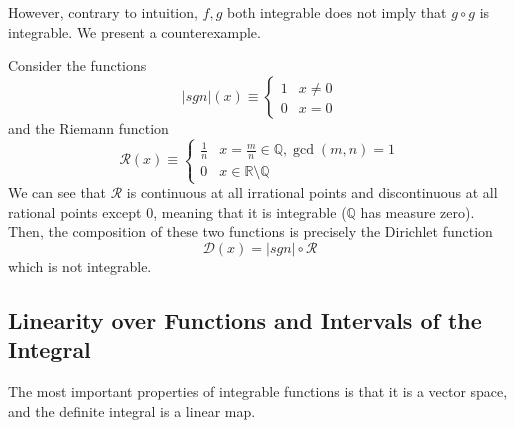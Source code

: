   However, contrary to intuition, $f, g$ both integrable does not imply that $g \circ g$ is integrable. We present a counterexample. 

  \begin{example}
    Consider the functions
    \[|sgn|(x) \equiv \begin{cases}
    1 & x \neq 0 \\
    0 & x = 0
    \end{cases}\]
    and the Riemann function 
    \[\mathcal{R}(x) \equiv \begin{cases}
    \frac{1}{n} & x = \frac{m}{n} \in \mathbb{Q}, \gcd(m, n) = 1 \\
    0 & x \in \mathbb{R} \setminus \mathbb{Q}
    \end{cases}\]
    We can see that $\mathcal{R}$ is continuous at all irrational points and discontinuous at all rational points except $0$, meaning that it is integrable ($\mathbb{Q}$ has measure zero). Then, the composition of these two functions is precisely the Dirichlet function
    \[\mathcal{D}(x) = |sgn| \circ \mathcal{R}\]
    which is not integrable. 
  \end{example}

\subsection{Linearity over Functions and Intervals of the Integral} 

  The most important properties of integrable functions is that it is a vector space, and the definite integral is a linear map. 
  
